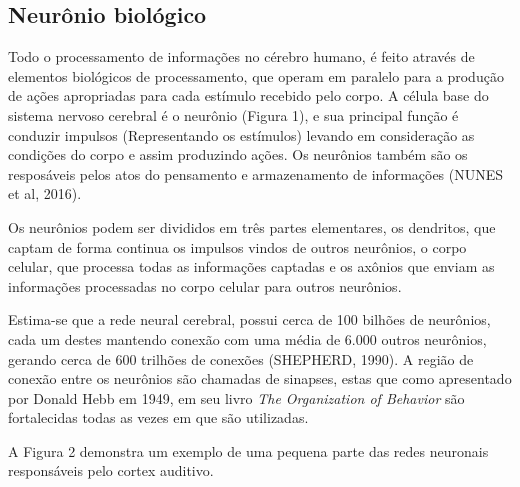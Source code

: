 \subsection{Neurônio biológico}


Todo o processamento de informações no cérebro humano, é feito através de elementos biológicos de processamento, que operam em paralelo para a produção de ações apropriadas para cada estímulo recebido pelo corpo. A célula base do sistema nervoso cerebral é o neurônio (Figura 1), e sua principal função é conduzir impulsos (Representando os estímulos) levando em consideração as condições do corpo e assim produzindo ações. Os neurônios também são os resposáveis pelos atos do pensamento e armazenamento de informações (NUNES et al, 2016).

Os neurônios podem ser divididos em três partes elementares, os dendritos, que captam de forma continua os impulsos vindos de outros neurônios, o corpo celular, que processa todas as informações captadas e os axônios que enviam as informações processadas no corpo celular para outros neurônios.


Estima-se que a rede neural cerebral, possui cerca de 100 bilhões de neurônios, cada um destes mantendo conexão com uma média de 6.000 outros neurônios, gerando cerca de 600 trilhões de conexões (SHEPHERD, 1990). A região de conexão entre os neurônios são chamadas de sinapses, estas que como apresentado por Donald Hebb em 1949, em seu livro \textit{The Organization of Behavior} são fortalecidas todas as vezes em que são utilizadas.


A Figura 2 demonstra um exemplo de uma pequena parte das redes neuronais responsáveis pelo cortex auditivo.

